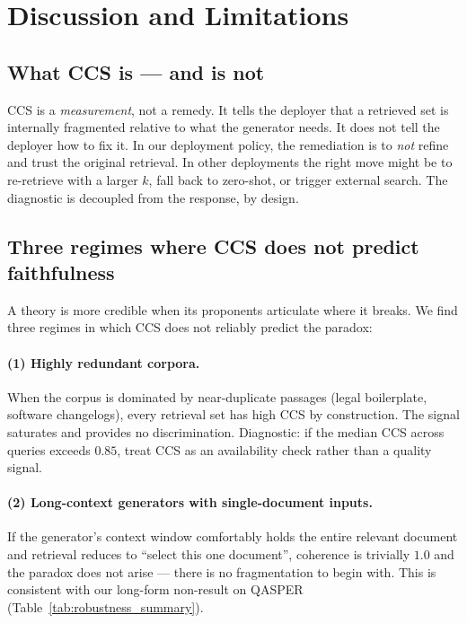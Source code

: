 \section{Discussion and Limitations}
\label{sec:discussion}

\subsection{What CCS is — and is not}
\label{sec:discussion:what_ccs_is}

CCS is a \emph{measurement}, not a remedy. It tells the deployer that
a retrieved set is internally fragmented relative to what the
generator needs. It does not tell the deployer how to fix it. In our
deployment policy, the remediation is to \emph{not} refine and trust
the original retrieval. In other deployments the right move might be
to re-retrieve with a larger $k$, fall back to zero-shot, or trigger
external search. The diagnostic is decoupled from the response, by
design.

\subsection{Three regimes where CCS does not predict faithfulness}
\label{sec:discussion:where_ccs_fails}

A theory is more credible when its proponents articulate where it
breaks. We find three regimes in which CCS does not reliably predict
the paradox:

\paragraph{(1) Highly redundant corpora.}
When the corpus is dominated by near-duplicate passages (legal
boilerplate, software changelogs), every retrieval set has high CCS
by construction. The signal saturates and provides no
discrimination. Diagnostic: if the median CCS across queries exceeds
$0.85$, treat CCS as an availability check rather than a quality
signal.

\paragraph{(2) Long-context generators with single-document inputs.}
If the generator's context window comfortably holds the entire
relevant document and retrieval reduces to ``select this one
document'', coherence is trivially $1.0$ and the paradox does not
arise --- there is no fragmentation to begin with. This is consistent
with our long-form non-result on QASPER (Table~\ref{tab:robustness_summary}).

